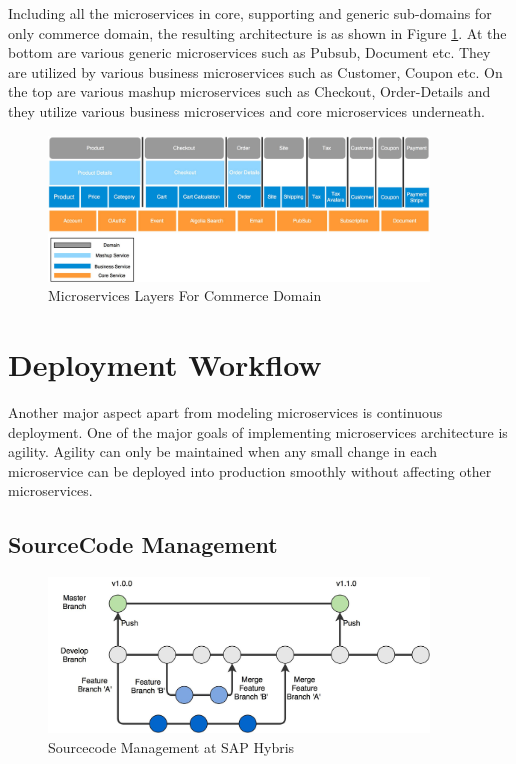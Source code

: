 Including all the microservices in core, supporting and generic sub-domains for only commerce domain, the resulting architecture is as shown in Figure \ref{fig:hybris_architecture/interview/microservices_layers_commerce_domain}. At the bottom are various generic microservices such as Pubsub, Document etc. They are utilized by various business microservices such as Customer, Coupon etc. On the top are various mashup microservices such as Checkout, Order-Details and they utilize various business microservices and core microservices underneath.
\begin{figure}[H]
\begin{center}
\includegraphics[width=0.9\textwidth]{figures/hybris_architecture_six}
\caption{Microservices Layers For Commerce Domain}
\label{fig:hybris_architecture/interview/microservices_layers_commerce_domain}
\end{center}
\end{figure}

\section{Deployment Workflow}\label{section:hybris_architecture/deployment_workflow}
Another major aspect apart from modeling microservices is continuous deployment. One of the major goals of implementing microservices architecture is agility. Agility can only be maintained when any small change in each microservice can be deployed into production smoothly without affecting other microservices.\\

\subsection{SourceCode Management}\label{section:hybris_architecture/deployment_workflow/sourcecode_management}
\begin{figure}[H]
\begin{center}
\includegraphics[width=0.9\textwidth]{figures/hybris_architecture_sourcecode_magement}
\caption{Sourcecode Management at SAP Hybris}
\label{fig:hybris_architecture/interview/sourcecode_management_at_hybris}
\end{center}
\end{figure}

